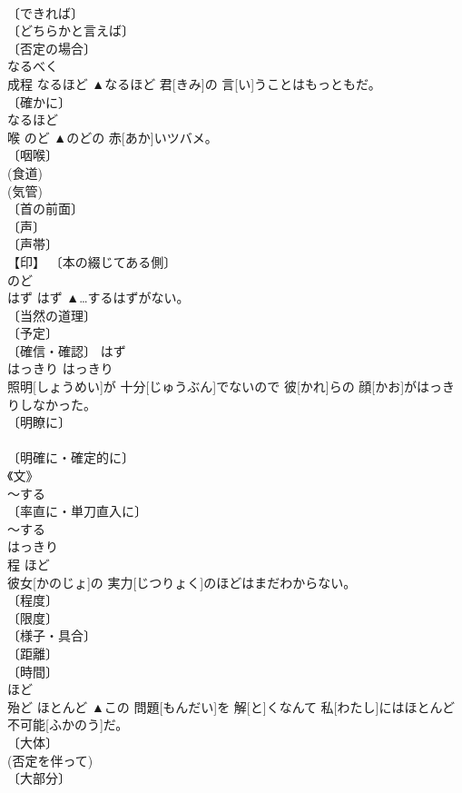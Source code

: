 \documentclass[8pt]{extreport}
\begin{document}
\begin{CJK}{UTF8}{min}
\\	〔できれば〕 
\\	〔どちらかと言えば〕 
\\	〔否定の場合〕 
\\	なるべく	
\\	成程	なるほど	▲なるほど 君[きみ]の 言[い]うことはもっともだ。	
\\	〔確かに〕 
\\	なるほど	
\\	喉	のど	▲のどの 赤[あか]いツバメ。	
\\	〔咽喉〕 
\\	(食道) 
\\	(気管) 
\\	〔首の前面〕 
\\	〔声〕 
\\	〔声帯〕 
\\	【印】 〔本の綴じてある側〕 
\\	のど	
\\	はず	はず	▲…するはずがない。	
\\	〔当然の道理〕 
\\	〔予定〕 
\\	〔確信・確認〕		はず	
\\	はっきり	はっきり	
\\	照明[しょうめい]が 十分[じゅうぶん]でないので 彼[かれ]らの 顔[かお]がはっきりしなかった。	
\\	〔明瞭に〕 
\\	[⇒あきらか] 
\\	〔明確に・確定的に〕 
\\	《文》 
\\	～する 
\\	〔率直に・単刀直入に〕 
\\	～する 
\\	はっきり	
\\	程	ほど	
\\	彼女[かのじょ]の 実力[じつりょく]のほどはまだわからない。	
\\	〔程度〕 
\\	〔限度〕 
\\	〔様子・具合〕 
\\	〔距離〕 
\\	〔時間〕 
\\	ほど	
\\	殆ど	ほとんど	▲この 問題[もんだい]を 解[と]くなんて 私[わたし]にはほとんど 不可能[ふかのう]だ。	
\\	〔大体〕 
\\	(否定を伴って) 
\\	〔大部分〕 

\end{CJK}
\end{document}
